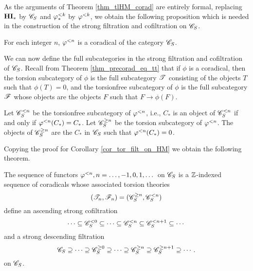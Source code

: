 As the arguments of Theorem \ref{thm_tlHM_corad} are 
entirely formal, replacing $\HM$ by $\CatLoc{C}{S}$ and $\tlHM{k}$ by
$\corad{k}$, we obtain the following proposition
which is needed in the construction of the strong filtration and
cofiltration on $\CatLoc{C}{S}$. 

\begin{prop}\label{prop_corad_loc_general}
For each integer $n$, $\corad{n}$ is a coradical of the category
$\CatLoc{C}{S}$.
\end{prop}

We can now define the full subcategories in the strong filtration
and cofiltration of $\CatLoc{C}{S}$. Recall from Theorem
\ref{thm_precorad_eq_tt} that if $\phi$ is a coradical, then the
torsion subcategory of $\phi$ is the full subcategory $\Cat{T}$
consisting of the objects $T$ such that $\phi(T) = 0$, and the
torsionfree subcategory of $\phi$ is the full subcategory $\Cat{F}$
whose objects are the objects $F$ such that $F \to \phi(F)$.

\begin{defn}\label{def_torsion_filt_general}
Let $\Corad{n}{\CatLoc{C}{S}}$ be the torsionfree subcategory of
$\corad{n}$, i.e., $C_*$ is an object of $\Corad{n}{\CatLoc{C}{S}}$
if and only if $\corad{n}(C_*) = C_*$. Let 
$\Prerad{n}{\CatLoc{C}{S}}$ be the torsion subcategory of $\corad{n}$.
The objects of $\Prerad{n}{\CatLoc{C}{S}}$ are the $C_*$ in 
$\CatLoc{C}{S}$ such that $\corad{n}(C_*) = 0$.
\end{defn}

Copying the proof for Corollary \ref{cor_tor_filt_on_HM} we obtain 
the following theorem.

\begin{thm}
\label{thm_sum_heart_loc}
The sequence of functors $\corad{n}, n = \dots, -1, 0, 1, \dots$ on
$\CatLoc{C}{S}$ is a $\Z$-indexed sequence of coradicals whose 
associated torsion theories 
\[
(\Cat{T}_n, \Cat{F}_n) = (\Prerad{n}{\CatLoc{C}{S}}, \Corad{n}{\CatLoc{C}{S}})
\]
define an ascending strong cofiltration
\[
\cdots \subseteq \Corad{0}{\CatLoc{C}{S}} \subseteq \cdots \subseteq 
   \Corad{n}{\CatLoc{C}{S}} \subseteq \Corad{n + 1}{\CatLoc{C}{S}}
   \subseteq \cdots
\]
and a strong descending filtration
\[
\CatLoc{C}{S} \supseteq \cdots \supseteq \Prerad{0}{\CatLoc{C}{S}}
   \supseteq \cdots \supseteq \Prerad{n}{\CatLoc{C}{S}} \supseteq 
   \Prerad{n + 1}{\CatLoc{C}{S}} \supseteq \cdots.
\]
on $\CatLoc{C}{S}$.
\end{thm}


